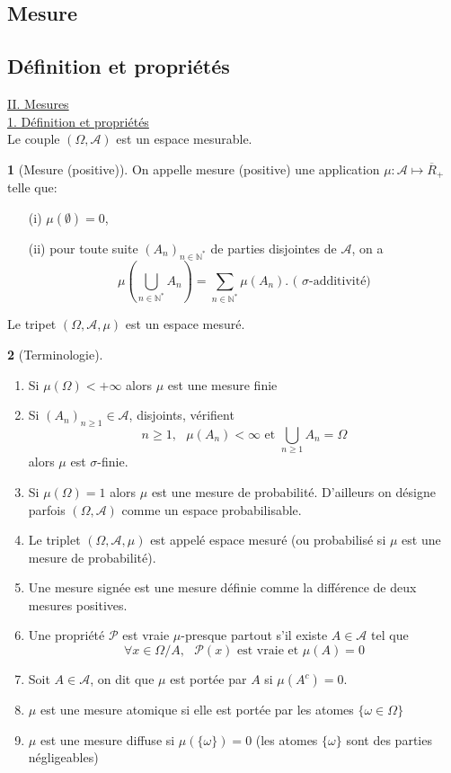 \documentclass[8pt,notheorems]{beamer}
\theoremstyle{definition}
\newtheorem{definition}{\translate{Definition}}
\theoremstyle{example}
\theoremstyle{mystyle}
\theoremstyle{plain}
\begin{document}
\begin{frame}[allowframebreaks]
\section{Mesure}
\subsection{Définition et propriétés}
\underline{II. Mesures}\\
\underline{1. Définition et propriétés}\\
Le couple $(\Omega,\mathcal{A})$ est un espace mesurable.
\begin{definition}[Mesure (positive)]
On appelle mesure (positive) une application $\mu:\mathcal{A}\mapsto \overline{R}_+$ telle que:
\begin{itemize}
\item[(i)] $\mu(\emptyset)=0$,
\item[(ii)] pour toute suite $(A_n)_{n\in\mathbb{N}^\ast}$ de parties disjointes de $\mathcal{A}$, on a
$$
\mu\left(\bigcup_{n\in\mathbb{N}^\ast} A_n\right)=\sum_{n\in\mathbb{N}^\ast} \mu(A_n). \text{ ( $\sigma$-additivité)}
$$
\end{itemize}
Le tripet $(\Omega, \mathcal{A},\mu)$ est un espace mesuré.
\end{definition}
\begin{definition}[Terminologie]
\begin{enumerate}
\item Si $\mu(\Omega)<+\infty$ alors $\mu$ est une mesure finie
\item Si $(A_n)_{n\geq1}\in\mathcal{A}$, disjoints, vérifient 
$$
n\geq1,\text{ }\mu(A_n)<\infty\text{ et }\bigcup_{n\geq1}A_n = \Omega
$$
alors $\mu$ est $\sigma$-finie.
\item Si $\mu(\Omega)=1$ alors $\mu$ est une mesure de probabilité. D'ailleurs on désigne parfois $(\Omega,\mathcal{A})$ comme un espace probabilisable.
\item Le triplet $(\Omega,\mathcal{A}, \mu)$ est appelé espace mesuré (ou probabilisé si $\mu$ est une mesure de probabilité).
\item Une mesure signée est une mesure définie comme la différence de deux mesures positives.
\item Une propriété $\mathcal{P}$ est vraie $\mu$-presque partout s'il existe $A\in\mathcal{A}$ tel que
$$
\forall x\in\Omega /A, \text{ }\mathcal{P}(x)\text{ est vraie et }\mu(A) = 0 
$$
\item Soit $A\in\mathcal{A}$, on dit que $\mu$ est portée par $A$ si $\mu(A^{c})=0$.
\item $\mu$ est une mesure atomique si elle est portée par les atomes $\{\omega\in\Omega\}$
\item $\mu$ est une mesure diffuse si $\mu(\{\omega\})=0$ (les atomes $\{\omega\}$ sont des parties négligeables)
\end{enumerate}
\end{definition}
\end{frame}
\end{document}
